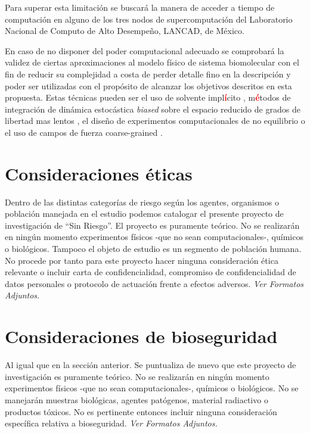 \documentclass[11pt,letterpaper,titlepage]{article} %
\newcommand{\red}[1]{\textcolor{red}{\textbf{#1}}}
\newcommand{\tout}[1]{\red{\textst{#1}}}
\begin{document}
Para superar esta limitación se buscará la manera de acceder a tiempo de
computación en alguno de los tres nodos de supercomputación del Laboratorio
Nacional de Computo de Alto Desempeño, LANCAD, de México.

En caso de no disponer del poder computacional adecuado se comprobará la validez
de ciertas aproximaciones al modelo físico de sistema biomolecular con el fin de
reducir su complejidad a costa de perder detalle fino en la descripción y poder
ser utilizadas con el propósito de alcanzar los objetivos descritos en esta
propuesta. Estas técnicas pueden ser el uso de solvente impl\red{í}cito
\red{\cite{Kleinjung2014}},\tout{ el uso de estrategias de escalado
  dimensional,} m\red{é}todos de integración de dinámica estocástica
\emph{biased} sobre el espacio reducido de grados de libertad mas lentos
\red{\cite{Wu2016}}, el diseño de experimentos computacionales de no equilibrio
\red{\cite{Sandberg2015}} o el uso de campos de fuerza coarse-grained
\red{\cite{Perilla2015}}.

\section{Consideraciones éticas}

Dentro de las distintas categorías de riesgo según los agentes, organismos o
población manejada en el estudio podemos catalogar el presente proyecto de
investigación de ``Sin Riesgo''. El proyecto es puramente teórico. No se
realizarán en ningún momento experimentos físicos -que no sean computacionales-,
químicos o biológicos. Tampoco el objeto de estudio es un segmento de población
humana. No procede por tanto para este proyecto hacer ninguna consideración
ética relevante o incluir carta de confidencialidad, compromiso de
confidencialidad de datos personales o protocolo de actuación frente a efectos
adversos. \emph{Ver Formatos Adjuntos.}

\section{Consideraciones de bioseguridad}

Al igual que en la sección anterior. Se puntualiza de nuevo que este proyecto de
investigación es puramente teórico. No se realizarán en ningún momento
experimentos físicos -que no sean computacionales-, químicos o biológicos. No se
manejarán muestras biológicas, agentes patógenos, material radiactivo o
productos tóxicos. No es pertinente entonces incluir ninguna consideración
específica relativa a bioseguridad.
\emph{Ver Formatos Adjuntos.}
\end{document}

